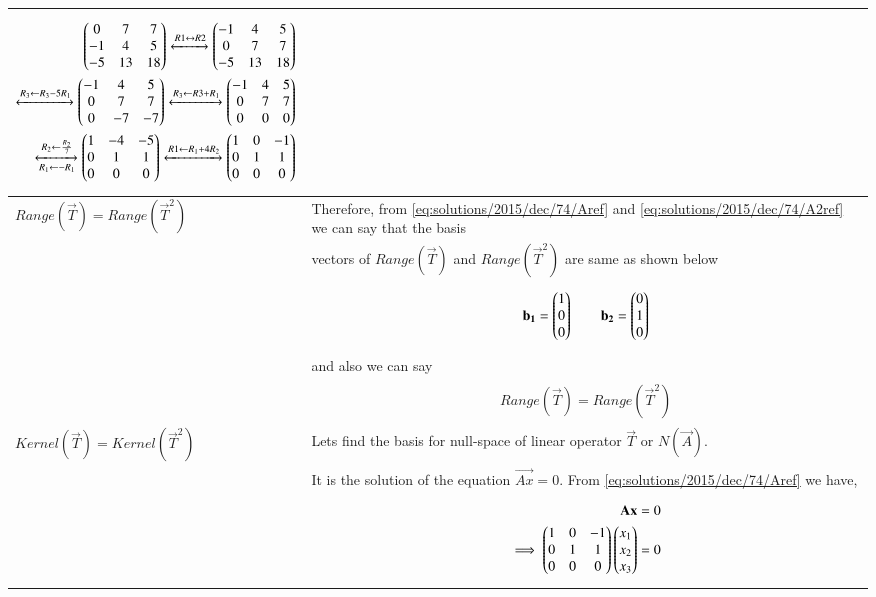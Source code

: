 \begin{longtable}{|l|l|}
{\begin{align}
    \begin{pmatrix}0&7&7\\-1&4&5\\-5&13&18\end{pmatrix}\xleftrightarrow[]{R1\leftrightarrow R2}\begin{pmatrix}-1&4&5\\0&7&7\\-5&13&18\end{pmatrix}\\\xleftrightarrow[]{R_3\leftarrow R_3-5R_1}\begin{pmatrix}-1&4&5\\0&7&7\\0&-7&-7\end{pmatrix}\xleftrightarrow[]{R_3\leftarrow R3+R_1}\begin{pmatrix}-1&4&5\\0&7&7\\0&0&0\end{pmatrix}\\\xleftrightarrow[R_1\leftarrow -R_1]{R_2\leftarrow\frac{R_2}{7}}\begin{pmatrix}1&-4&-5\\0&1&1\\0&0&0\end{pmatrix}\xleftrightarrow[]{R1\leftarrow R_1+4R_2}\begin{pmatrix}1&0&-1\\0&1&1\\0&0&0\end{pmatrix}\label{eq:solutions/2015/dec/74/A2ref}
\end{align}}\\
\hline $Range(\vec{T})=Range(\vec{T}^2)$&Therefore, from \eqref{eq:solutions/2015/dec/74/Aref} and \eqref{eq:solutions/2015/dec/74/A2ref} we can say that the basis\\&vectors of $Range(\vec{T})$ and $Range(\vec{T}^2)$ are same as shown below\\&\parbox{11cm}{\begin{align}
    \mathbf{b_1}=\begin{pmatrix}1\\0\\0\end{pmatrix}\quad\quad\mathbf{b_2}=\begin{pmatrix}0\\1\\0\end{pmatrix}\label{eq:solutions/2015/dec/74/basis}
\end{align}}\\&and also we can say\\&\parbox{11cm}{\begin{align}
    Range(\vec{T})=Range(\vec{T}^2)\label{eq:solutions/2015/dec/74/exp1}
\end{align}}\\
\hline
$Kernel(\vec{T})=Kernel(\vec{T}^2)$&Lets find the basis for null-space of linear operator $\vec{T}$ or $N(\vec{A})$.\\&It is the solution of the equation $\vec{Ax}=0$. From \eqref{eq:solutions/2015/dec/74/Aref} we have,\\&\parbox{11cm}{\begin{align}
\vec{Ax} &= 0\\
\implies\myvec{1&0&-1\\0&1&1\\0&0&0}\myvec{x_1\\x_2\\x_3} &= 0

\end{align}}
\end{longtable}
